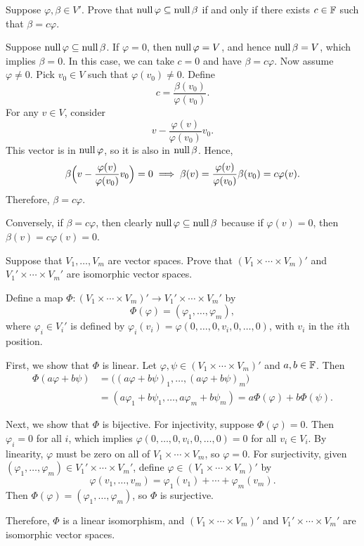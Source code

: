 \begin{exercise}
Suppose $\varphi,\beta\in V'$. Prove that $\operatorname{null}\varphi\subseteq\operatorname{null}\beta$ if and
only if there exists $c\in\mathbb{F}$ such that $\beta=c\varphi$.
\end{exercise}
\begin{solution}
Suppose $\operatorname{null}\varphi\subseteq\operatorname{null}\beta$. If $\varphi=0$, then $\operatorname{null}\varphi=V$,
and hence $\operatorname{null}\beta=V$, which implies $\beta=0$. In this case, we can take
$c=0$ and have $\beta=c\varphi$. Now assume $\varphi\ne0$. Pick $v_0\in V$ such
that $\varphi(v_0)\ne0$. Define
\[ c = \frac{\beta(v_0)}{\varphi(v_0)}. \]
For any $v\in V$, consider
\[ v-\frac{\varphi(v)}{\varphi(v_0)}v_0. \]
This vector is in $\operatorname{null}\varphi$, so it is also in $\operatorname{null}\beta$. Hence,
\[ \beta\Bigl(v-\frac{\varphi(v)}{\varphi(v_0)}v_0\Bigr) = 0
   \implies \beta(v) = \frac{\varphi(v)}{\varphi(v_0)}\beta(v_0) = c\varphi(v). \]
Therefore, $\beta=c\varphi$.

Conversely, if $\beta=c\varphi$, then clearly $\operatorname{null}\varphi\subseteq\operatorname{null}\beta$
because if $\varphi(v)=0$, then $\beta(v)=c\varphi(v)=0$.
\end{solution}

\begin{exercise}
Suppose that $V_1,\dots,V_m$ are vector spaces. Prove that
$(V_1\times\cdots\times V_m)'$ and ${V_1}'\times\cdots\times{V_m}'$ are
isomorphic vector spaces.
\end{exercise}
\begin{solution}
Define a map
$\Phi\colon(V_1\times\cdots\times V_m)'\to{V_1}'\times\cdots\times{V_m}'$ by
\[ \Phi(\varphi) = (\varphi_1,\dots,\varphi_m), \]
where $\varphi_i\in{V_i}'$ is defined by
$\varphi_i(v_i)=\varphi(0,\dots,0,v_i,0,\dots,0)$, with $v_i$ in the
$i$th position.

First, we show that $\Phi$ is linear. Let
$\varphi,\psi\in(V_1\times\cdots\times V_m)'$ and $a,b\in\mathbb{F}$. Then
\begin{align*}
\Phi(a\varphi+b\psi)
 &= \bigl((a\varphi+b\psi)_1,\dots,(a\varphi+b\psi)_m\bigr)\\
 &= (a\varphi_1+b\psi_1,\dots,a\varphi_m+b\psi_m) = a\Phi(\varphi)+b\Phi(\psi).
\end{align*}

Next, we show that $\Phi$ is bijective. For injectivity, suppose
$\Phi(\varphi)=0$. Then $\varphi_i=0$ for all $i$, which implies
$\varphi(0,\dots,0,v_i,0,\dots,0)=0$ for all $v_i\in V_i$. By linearity,
$\varphi$ must be zero on all of $V_1\times\cdots\times V_m$, so $\varphi=0$.
For surjectivity, given
$(\varphi_1,\dots,\varphi_m)\in{V_1}'\times\cdots\times{V_m}'$, define
$\varphi\in(V_1\times\cdots\times V_m)'$ by
\[ \varphi(v_1,\dots,v_m) = \varphi_1(v_1)+\cdots+\varphi_m(v_m). \]
Then $\Phi(\varphi)=(\varphi_1,\dots,\varphi_m)$, so $\Phi$ is surjective.

Therefore, $\Phi$ is a linear isomorphism, and $(V_1\times\cdots\times V_m)'$
and ${V_1}'\times\cdots\times{V_m}'$ are isomorphic vector spaces.
\end{solution}

